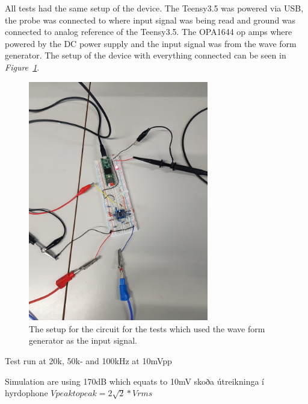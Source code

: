 All tests had the same setup of the device.
The Teensy3.5 was powered via USB, the probe was connected to where input signal was being read and ground was connected to analog reference of the Teensy3.5.
The OPA1644 op amps where powered by the DC power supply and the input signal was from the wave form generator.
The setup of the device with everything connected can be seen in \textit{Figure~\ref{fig:testCircSetup}}.

\begin{figure}[h]
    \centering
    \includegraphics[width=0.7\textwidth]{graphics/TestSetup.jpg}
    \caption{The setup for the circuit for the tests which used the wave form generator as the input signal.}
    \label{fig:testCircSetup}
\end{figure}

Test run at 20k, 50k- and 100kHz at 10mVpp

Simulation are using 170dB which equats to 10mV skoða útreikninga í hyrdophone
\textbf{$Vpeak to peak = 2\sqrt{2}*Vrms$}







